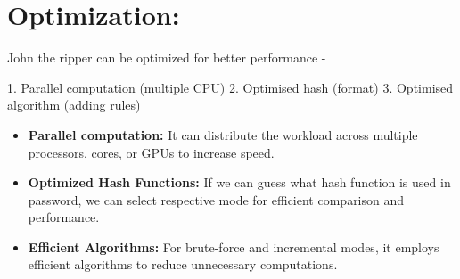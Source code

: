 \documentclass[12pt, A4Paper]{article}
\begin{document}
\section{Optimization:}
John the ripper can be optimized for better performance -

1. Parallel computation (multiple CPU)
2. Optimised hash (format)
3. Optimised algorithm (adding rules)

\begin{itemize}
    \item \textbf{Parallel computation:} It can distribute the workload across multiple processors, cores, or GPUs to increase speed.  
    \item \textbf{Optimized Hash Functions:} If we can guess what hash function is used in password, we can select respective mode for efficient comparison and performance.
    \item \textbf{Efficient Algorithms:} For brute-force and incremental modes, it employs efficient algorithms to reduce unnecessary computations.
    
\end{itemize}

\vspace{0.4cm}
\end{document}

